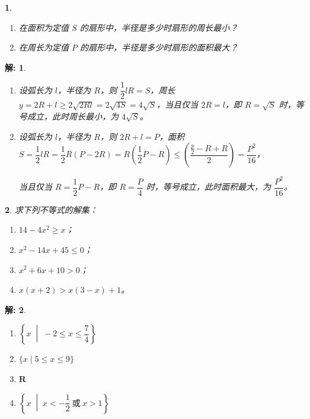 \documentclass[aspectratio=169,13pt,fleqn,t] {beamer}
\newtheorem*{solve}{解:}
\newtheorem{Prob}{}
\begin{document}
\begin{frame}
	\begin{Prob}
		\begin{enumerate}[(1)]
			\item 在面积为定值 $S$ 的扇形中，半径是多少时扇形的周长最小？
			\item 在周长为定值 $P$ 的扇形中，半径是多少时扇形的面积最大？
		\end{enumerate}
	\end{Prob}
	
	\begin{solve}
		\begin{enumerate}[(1)]
			\item 设弧长为 $l$，半径为 $R$，则 $\dfrac{1}{2}lR=S$，周长 $y=2R+l\geq 2\sqrt{2Rl}=2\sqrt{4S}=4\sqrt{S}$，当且仅当 $2R=l$，即 $R=\sqrt{S}$ 时，等号成立，此时周长最小，为 $4\sqrt{S}$。
			\item 设弧长为 $l$，半径为 $R$，则 $2R+l=P$，面积 $S=\dfrac{1}{2}lR=\dfrac{1}{2}R(P-2R)=R\left(\dfrac{1}{2}P-R\right) \leqslant\left(\dfrac{\frac{p}{2}-R+R}{2}\right)=\dfrac{P^2}{16}$，
			
			当且仅当 $R=\dfrac{1}{2}P - R$，即 $R=\dfrac{P}{4}$ 时，等号成立，此时面积最大，为 $\dfrac{P^2}{16}$。
		\end{enumerate}
		
	\end{solve}
\end{frame}

\begin{frame}
	\vspace{-1em}
	\begin{Prob}
		求下列不等式的解集：
		\begin{enumerate}[(1)]
			\item $14-4x^2\geq x$；
			\item  $x^2-14x+45\leq 0$；
			\item   $x^2+6x+10>0$；
			\item   $x(x+2)>x(3-x)+1$。
		\end{enumerate}		
	\end{Prob}
	\vspace{-1em}
	\begin{solve}
		\begin{enumerate}[(1)]
		
	\item  $\left\{x\;\middle|\;-2\leq x\leq \dfrac{7}{4}\right\}$
	
	\item  $\{x\mid 5\leq x\leq 9\}$
	
	\item  $\mathbf{R}$
	
	\item  $\left\{x\;\middle|\;x<-\dfrac{1}{2}\ \text{或}\ x>1\right\}$
	\end{enumerate}
	\end{solve}
\end{frame}
\end{document}
